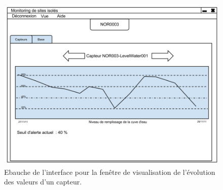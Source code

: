 \begin{figure}[hb]
  \centering
  \includegraphics[width=15cm]{Supervision/InterfaceSupervision2.png}
  \caption[Ebauche de l'interface pour la fenêtre de visualisation de l'évolution des valeurs d'un capteur.]%
  {Ebauche de l'interface pour la fenêtre de visualisation de l'évolution des valeurs d'un capteur.}
\end{figure}
 
